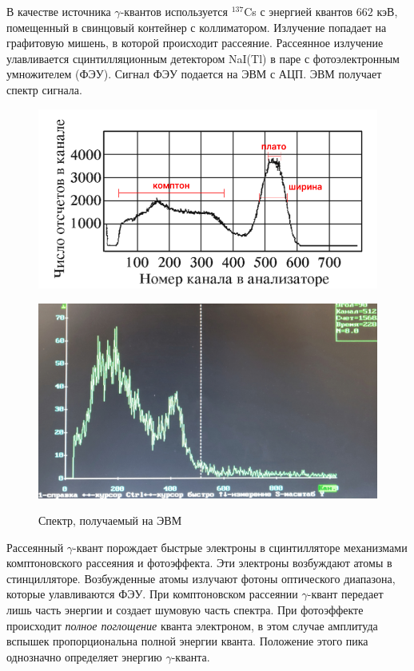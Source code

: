 \documentclass[12pt,a4paper]{article}
\begin{document}
	В качестве источника $\gamma$-квантов используется $^{137}$Cs с энергией квантов $662$ кэВ, помещенный в свинцовый контейнер с коллиматором. Излучение попадает на графитовую мишень, в которой происходит рассеяние. Рассеянное излучение улавливается сцинтилляционным детектором NaI(Tl) в паре с фотоэлектронным умножителем (ФЭУ). Сигнал ФЭУ подается на ЭВМ с АЦП. ЭВМ получает спектр сигнала.
	
	\begin{figure}[H]
		\centering
		\begin{minipage}{0.5\textwidth}
			\centering
			\includegraphics[width=0.9\linewidth]{res/spectrum.png}
			\label{fig:spectrum}
		\end{minipage}%
		\begin{minipage}{0.5\textwidth}
			\centering
			\includegraphics[width=0.9\linewidth]{photos/spectrum.jpg}			\label{fig:real_spectrum}
		\end{minipage}
		\caption{Спектр, получаемый на ЭВМ}
	\end{figure}
	
	Рассеянный $\gamma$-квант порождает быстрые электроны в сцинтилляторе механизмами комптоновского рассеяния и фотоэффекта. Эти электроны возбуждают атомы в стинцилляторе. Возбужденные атомы излучают фотоны оптического диапазона, которые улавливаются ФЭУ.
	При комптоновском рассеянии $\gamma$-квант передает лишь часть энергии и создает шумовую часть спектра. При фотоэффекте происходит \textit{полное поглощение} кванта электроном, в этом случае амплитуда вспышек пропорциональна полной энергии кванта. Положение этого пика однозначно определяет энергию $\gamma$-кванта.
	
\end{document}
